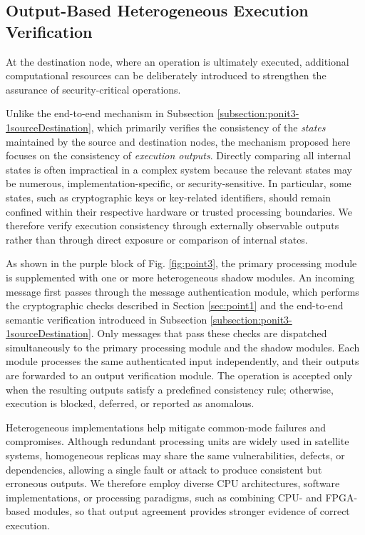 \documentclass[journal]{IEEEtran}
\begin{document}
\subsection{Output-Based Heterogeneous Execution Verification}
\label{subsection:ponit3-3Destination}

At the destination node, where an operation is ultimately executed, additional computational resources can be deliberately introduced to strengthen the assurance of security-critical operations.

Unlike the end-to-end mechanism in Subsection \ref{subsection:ponit3-1sourceDestination}, which primarily verifies the consistency of the \textit{states} maintained by the source and destination nodes, the mechanism proposed here focuses on the consistency of \textit{execution outputs}.
Directly comparing all internal states is often impractical in a complex system because the relevant states may be numerous, implementation-specific, or security-sensitive.
In particular, some states, such as cryptographic keys or key-related identifiers, should remain confined within their respective hardware or trusted processing boundaries.
We therefore verify execution consistency through externally observable outputs rather than through direct exposure or comparison of internal states.

As shown in the purple block of Fig. \ref{fig:point3}, the primary processing module is supplemented with one or more heterogeneous shadow modules.
An incoming message first passes through the message authentication module, which performs the cryptographic checks described in Section \ref{sec:point1} and the end-to-end semantic verification introduced in Subsection \ref{subsection:ponit3-1sourceDestination}.
Only messages that pass these checks are dispatched simultaneously to the primary processing module and the shadow modules.
Each module processes the same authenticated input independently, and their outputs are forwarded to an output verification module.
The operation is accepted only when the resulting outputs satisfy a predefined consistency rule; otherwise, execution is blocked, deferred, or reported as anomalous.

Heterogeneous implementations help mitigate common-mode failures and compromises.
Although redundant processing units are widely used in satellite systems, homogeneous replicas may share the same vulnerabilities, defects, or dependencies, allowing a single fault or attack to produce consistent but erroneous outputs.
We therefore employ diverse CPU architectures, software implementations, or processing paradigms, such as combining CPU- and FPGA-based modules, so that output agreement provides stronger evidence of correct execution.
\end{document}
